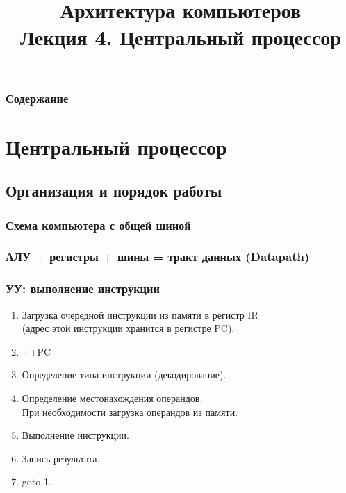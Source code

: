 \newcommand{\h}{handout,%
}



\title[Центральный процессор]{Архитектура компьютеров\texorpdfstring{\\}{ }Лекция 4. Центральный процессор}



\begin{frame}
\titlepage
\end{frame}

\begin{frame}
\frametitle{Содержание}
\tableofcontents%
\end{frame}

\section {Центральный процессор}

\subsection{Организация и порядок работы}

\begin{frame}
\frametitle{Схема компьютера с общей шиной}
\end{frame}

\begin{frame}
\frametitle{АЛУ + регистры + шины = тракт данных (Datapath)}
\end{frame}

\begin{frame}
\frametitle{УУ: выполнение инструкции}
\begin{enumerate}[<+->]
    \item Загрузка очередной инструкции из памяти в регистр IR\\
    (адрес этой инструкции хранится в регистре PC).
    \item ++PC
    \item Определение типа инструкции (декодирование).
    \item Определение местонахождения операндов.\\
        При необходимости загрузка операндов из памяти.
    \item Выполнение инструкции.
    \item Запись результата.
    \item goto 1.
\end{enumerate}
\end{frame}

